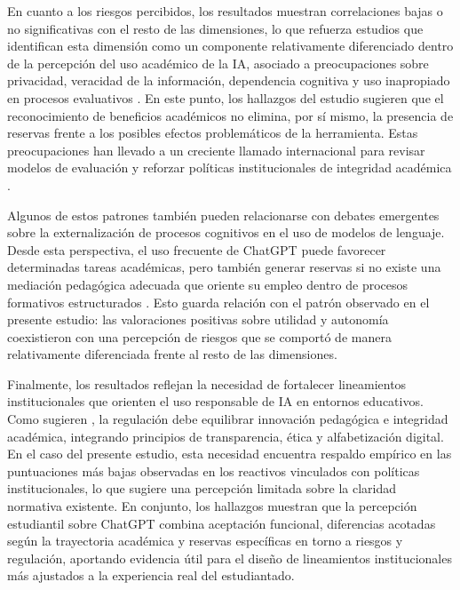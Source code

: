 \documentclass[spanish]{textolivre}
\begin{document}
En cuanto a los riesgos percibidos, los resultados muestran correlaciones bajas o no significativas con el resto de las dimensiones, lo que refuerza estudios que identifican esta dimensión como un componente relativamente diferenciado dentro de la percepción del uso académico de la IA, asociado a preocupaciones sobre privacidad, veracidad de la información, dependencia cognitiva y uso inapropiado en procesos evaluativos \cite{Bender2021,Jose2025}. En este punto, los hallazgos del estudio sugieren que el reconocimiento de beneficios académicos no elimina, por sí mismo, la presencia de reservas frente a los posibles efectos problemáticos de la herramienta. Estas preocupaciones han llevado a un creciente llamado internacional para revisar modelos de evaluación y reforzar políticas institucionales de integridad académica \cite{Cotton2024,Marin2025,SolSokHeng2025,WangCornely2023}.

Algunos de estos patrones también pueden relacionarse con debates emergentes sobre la externalización de procesos cognitivos en el uso de modelos de lenguaje. Desde esta perspectiva, el uso frecuente de ChatGPT puede favorecer determinadas tareas académicas, pero también generar reservas si no existe una mediación pedagógica adecuada que oriente su empleo dentro de procesos formativos estructurados \cite{Hong2025,Jose2025}. Esto guarda relación con el patrón observado en el presente estudio: las valoraciones positivas sobre utilidad y autonomía coexistieron con una percepción de riesgos que se comportó de manera relativamente diferenciada frente al resto de las dimensiones.

Finalmente, los resultados reflejan la necesidad de fortalecer lineamientos institucionales que orienten el uso responsable de IA en entornos educativos. Como sugieren \textcite{GarciaLopezTrujilloLinan2025}, la regulación debe equilibrar innovación pedagógica e integridad académica, integrando principios de transparencia, ética y alfabetización digital. En el caso del presente estudio, esta necesidad encuentra respaldo empírico en las puntuaciones más bajas observadas en los reactivos vinculados con políticas institucionales, lo que sugiere una percepción limitada sobre la claridad normativa existente. En conjunto, los hallazgos muestran que la percepción estudiantil sobre ChatGPT combina aceptación funcional, diferencias acotadas según la trayectoria académica y reservas específicas en torno a riesgos y regulación, aportando evidencia útil para el diseño de lineamientos institucionales más ajustados a la experiencia real del estudiantado.
\end{document}
